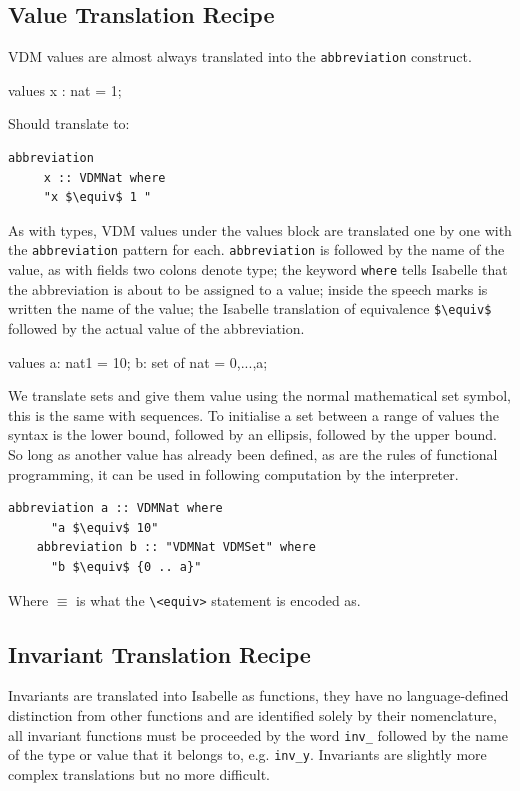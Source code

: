 	\subsection{Value Translation Recipe}
	VDM values are almost always translated into the \lstinline[language=Isabelle, mathescape]{abbreviation} construct.
	\begin{vdmsl}
	values
	x : nat = 1;
	\end{vdmsl}
	Should translate to:
	\begin{lstlisting}[language=Isabelle, mathescape]
	abbreviation
	 x :: VDMNat where 
	 "x $\equiv$ 1 " 
	\end{lstlisting}
	As with types, VDM values under the values block are translated one by one with the \lstinline[language=Isabelle, mathescape]{abbreviation} pattern for each. \lstinline[language=Isabelle, mathescape]{abbreviation} is followed by the name of the value, as with fields two colons denote type; the keyword \lstinline[language=Isabelle, mathescape]{where} tells Isabelle that the abbreviation is about to be assigned to a value; inside the speech marks is written the name of the value; the Isabelle translation of equivalence \lstinline[language=Isabelle, mathescape]{$\equiv$} followed by the actual value of the abbreviation.
	\begin{vdmsl}
	values
		a: nat1 = 10;
		b: set of nat = {0,...,a};
	\end{vdmsl}
	We translate sets and give them value using the normal mathematical set symbol, this is the same with sequences. To initialise a set between a range of values the syntax is the lower bound, followed by an ellipsis, followed by the upper bound. So long as another value has already been defined, as are the rules of functional programming, it can be used in following computation by the interpreter.
	\begin{lstlisting}[language=Isabelle, mathescape, mathescape]
	abbreviation a :: VDMNat where 
	  "a $\equiv$ 10"
	abbreviation b :: "VDMNat VDMSet" where 
	  "b $\equiv$ {0 .. a}" 
	\end{lstlisting}
	Where $\equiv$ is what the \lstinline[language=Isabelle, mathescape]{\<equiv>} statement is encoded as.

	\subsection{Invariant Translation Recipe}
	Invariants are translated into Isabelle as functions, they have no language-defined distinction from other functions and are identified solely by their nomenclature, all invariant functions must be proceeded by the word \lstinline[language=Isabelle, mathescape]{inv_} followed by the name of the type or value that it belongs to, e.g. \lstinline[language=Isabelle, mathescape]{inv_y}. Invariants are slightly more complex translations but no more difficult.

